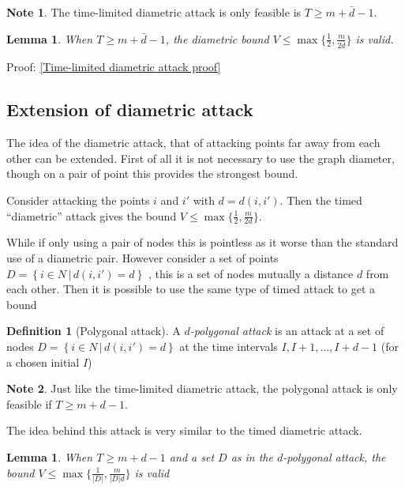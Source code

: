 \documentclass[a4paper,10pt]{article}
\newcommand{\set}[2]{\left\{ #1 \, | \, #2 \right\}}
\newtheorem{lemma}[theorem]{Lemma}
\theoremstyle{definition}
\newtheorem{definition}[theorem]{Definition}
\theoremstyle{definition}
\theoremstyle{remark}
\theoremstyle{definition}
\newtheorem*{note}{Note}
\begin{document}
\begin{note}
The time-limited diametric attack is only feasible is $T \geq m+\bar{d}-1$.
\end{note}

\begin{lemma}
When $T \geq m+ \bar{d}-1$, the diametric bound $V \leq \max\{\frac{1}{2},\frac{m}{2\bar{d}}\}$ is valid.
\end{lemma}

Proof: \ref{Time-limited diametric attack proof}


\subsection{Extension of diametric attack}

The idea of the diametric attack, that of attacking points far away from each other can be extended. First of all it is not necessary to use the graph diameter, though on a pair of point this provides the strongest bound.

Consider attacking the points $i$ and $i'$ with $d=d(i,i')$. Then the timed ``diametric'' attack gives the bound $V \leq \max \{ \frac{1}{2} , \frac{m}{2d} \}$.

While if only using a pair of nodes this is pointless as it worse than the standard use of a diametric pair. However consider a set of points $D= \set{i \in N}{ d(i,i')=d}$ , this is a set of nodes mutually a distance $d$ from each other. Then it is possible to use the same type of timed attack to get a bound

\begin{definition}[Polygonal attack]
A \textit{$d$-polygonal attack} is an attack at a set of nodes $D= \set{i \in N}{ d(i,i')=d}$ at the time intervals $I,I+1,...,I+d-1$ (for a chosen initial $I$)
\end{definition}

\begin{note}
Just like the time-limited diametric attack, the polygonal attack is only feasible if $T \geq m+d-1$.
\end{note}

The idea behind this attack is very similar to the timed diametric attack.

\begin{lemma}
When $T \geq m+d-1$ and a set $D$ as in the $d$-polygonal attack, the bound $V \leq \max \{ \frac{1}{|D|} , \frac{m}{|D|d} \}$ is valid
\end{lemma}
\end{document}
